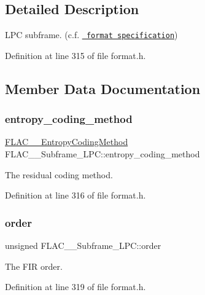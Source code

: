\subsection{Detailed Description}
L\+PC subframe. (c.\+f. \href{../format.html\#subframe_lpc}{\texttt{ format specification}}) 

Definition at line 315 of file format.\+h.



\subsection{Member Data Documentation}
\mbox{\label{struct_f_l_a_c_____subframe___l_p_c_adb1401b2f8af05132420145a99f68c6e}} 
\subsubsection{\texorpdfstring{entropy\_coding\_method}{entropy\_coding\_method}}
{\footnotesize\ttfamily \mbox{\hyperlink{struct_f_l_a_c_____entropy_coding_method}{F\+L\+A\+C\+\_\+\+\_\+\+Entropy\+Coding\+Method}} F\+L\+A\+C\+\_\+\+\_\+\+Subframe\+\_\+\+L\+P\+C\+::entropy\+\_\+coding\+\_\+method}

The residual coding method. 

Definition at line 316 of file format.\+h.

\mbox{\label{struct_f_l_a_c_____subframe___l_p_c_a0de317accaf8a9f86194f97c378b2f86}} 
\subsubsection{\texorpdfstring{order}{order}}
{\footnotesize\ttfamily unsigned F\+L\+A\+C\+\_\+\+\_\+\+Subframe\+\_\+\+L\+P\+C\+::order}

The F\+IR order. 

Definition at line 319 of file format.\+h.

\mbox{\label{struct_f_l_a_c_____subframe___l_p_c_ad0b37ee925e2124a37fe3a513d5410b8}} 
